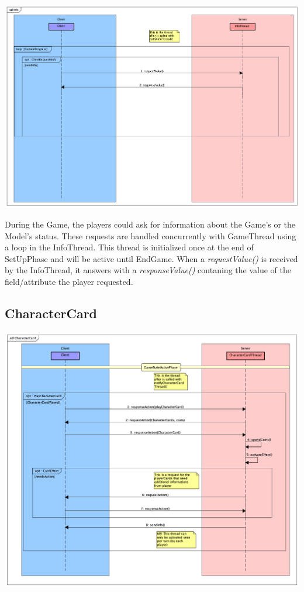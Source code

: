 \documentclass[12pt]{article}
\begin{document}
			\begin{center}
				\includegraphics[width=\textwidth,height=\textheight,keepaspectratio]{img/Info}
			\end{center}
			
			During the Game, the players could ask for information about the Game's or the Model's status. These requests are handled concurrently with GameThread using a loop in the InfoThread. This thread is initialized once at the end of SetUpPhase and will be active until EndGame. When a \emph{requestValue()} is received by the InfoThread, it answers with a \emph{responseValue()} contaning the value of the field/attribute the player requested.
			
		\subsection{CharacterCard}
		
			\begin{center}
				\includegraphics[width=\textwidth,height=\textheight,keepaspectratio]{CharacterCard}
			\end{center}
		
\end{document}

